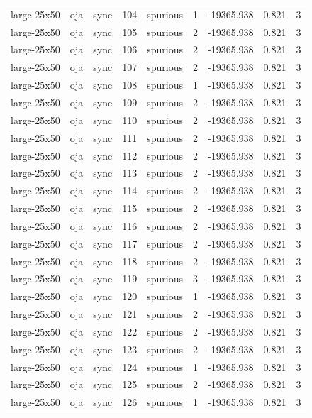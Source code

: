 \begin{tabular}{lllrlrrrr}
large-25x50 & oja & sync & 104 & spurious & 1 & -19365.938 & 0.821 & 3 \\
large-25x50 & oja & sync & 105 & spurious & 2 & -19365.938 & 0.821 & 3 \\
large-25x50 & oja & sync & 106 & spurious & 2 & -19365.938 & 0.821 & 3 \\
large-25x50 & oja & sync & 107 & spurious & 2 & -19365.938 & 0.821 & 3 \\
large-25x50 & oja & sync & 108 & spurious & 1 & -19365.938 & 0.821 & 3 \\
large-25x50 & oja & sync & 109 & spurious & 2 & -19365.938 & 0.821 & 3 \\
large-25x50 & oja & sync & 110 & spurious & 2 & -19365.938 & 0.821 & 3 \\
large-25x50 & oja & sync & 111 & spurious & 2 & -19365.938 & 0.821 & 3 \\
large-25x50 & oja & sync & 112 & spurious & 2 & -19365.938 & 0.821 & 3 \\
large-25x50 & oja & sync & 113 & spurious & 2 & -19365.938 & 0.821 & 3 \\
large-25x50 & oja & sync & 114 & spurious & 2 & -19365.938 & 0.821 & 3 \\
large-25x50 & oja & sync & 115 & spurious & 2 & -19365.938 & 0.821 & 3 \\
large-25x50 & oja & sync & 116 & spurious & 2 & -19365.938 & 0.821 & 3 \\
large-25x50 & oja & sync & 117 & spurious & 2 & -19365.938 & 0.821 & 3 \\
large-25x50 & oja & sync & 118 & spurious & 2 & -19365.938 & 0.821 & 3 \\
large-25x50 & oja & sync & 119 & spurious & 3 & -19365.938 & 0.821 & 3 \\
large-25x50 & oja & sync & 120 & spurious & 1 & -19365.938 & 0.821 & 3 \\
large-25x50 & oja & sync & 121 & spurious & 2 & -19365.938 & 0.821 & 3 \\
large-25x50 & oja & sync & 122 & spurious & 2 & -19365.938 & 0.821 & 3 \\
large-25x50 & oja & sync & 123 & spurious & 2 & -19365.938 & 0.821 & 3 \\
large-25x50 & oja & sync & 124 & spurious & 1 & -19365.938 & 0.821 & 3 \\
large-25x50 & oja & sync & 125 & spurious & 2 & -19365.938 & 0.821 & 3 \\
large-25x50 & oja & sync & 126 & spurious & 1 & -19365.938 & 0.821 & 3 \\

\end{tabular}
